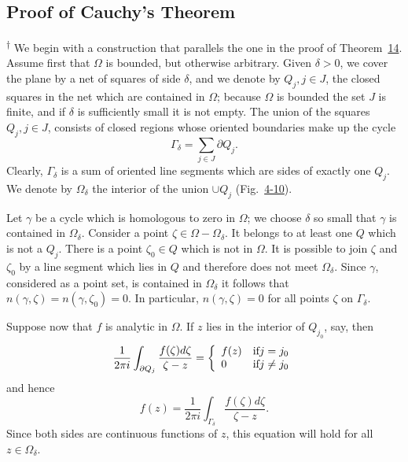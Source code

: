 \setcounter{section}{4}\setcounter{subsection}{4}\subsection{Proof of Cauchy's Theorem}\label{sec:4.4.5}
\hyperlink{fn:158:dagger}{\textsuperscript{\ensuremath{\dagger}}} We begin with a construction that parallels the one in the proof of Theorem~\hyperref[thm:4.14]{14}. Assume first that $\Omega$ is bounded, but otherwise arbitrary. Given $\delta > 0$, we cover the plane by a net of squares of side $\delta$, and we denote by $Q_j, j \in J$, the closed squares in the net which are contained in $\Omega$; because $\Omega$ is bounded the set $J$ is finite, and if $\delta$ is sufficiently small it is not empty. The union of the squares $Q_j, j \in J$, consists of closed regions whose oriented boundaries make up the cycle
\begin{equation*}
\Gamma_ {\delta} = \sum_ {j \in J} \partial Q _ {j}.
\end{equation*}
Clearly, $\Gamma_{\delta}$ is a sum of oriented line segments which are sides of exactly one $Q_{j}$. We denote by $\Omega_{\delta}$ the interior of the union $\cup Q_{j}$ (Fig.~\hyperref[fig:4-10]{4-10}).

Let $\gamma$ be a cycle which is homologous to zero in $\Omega$; we choose $\delta$ so small that $\gamma$ is contained in $\Omega_{\delta}$. Consider a point $\zeta \in \Omega - \Omega_{\delta}$. It belongs to at least one $Q$ which is not a $Q_{j}$. There is a point $\zeta_0 \in Q$ which is not in $\Omega$. It is possible to join $\zeta$ and $\zeta_0$ by a line segment which lies in $Q$ and therefore does not meet $\Omega_{\delta}$. Since $\gamma$, considered as a point set, is contained in $\Omega_{\delta}$ it follows that $n(\gamma, \zeta) = n(\gamma, \zeta_0) = 0$. In particular, $n(\gamma, \zeta) = 0$ for all points $\zeta$ on $\Gamma_{\delta}$.

\begingroup\renewcommand{\thefootnote}{}\endgroup

Suppose now that $f$ is analytic in $\Omega$. If $z$ lies in the interior of $Q_{j_0}$, say, then
\begin{equation*}
\frac {1}{2 \pi i} \int_ {\partial Q _ {j}} \frac {f (\zeta) d \zeta}{\zeta - z} = \left\{ \begin{array}{l l} f (z) & \text {if} j = j _ {0} \\ 0 & \text {if} j \neq j _ {0} \end{array} \right.
\end{equation*}
and hence
\begin{equation*}
f (z) = \frac {1}{2 \pi i} \int_ {\Gamma_ {\delta}} \frac {f (\zeta) d \zeta}{\zeta - z}.\tag{41}\label{eq:4.41}
\end{equation*}
Since both sides are continuous functions of $z$, this equation will hold for all $z \in \Omega_{\delta}$.

